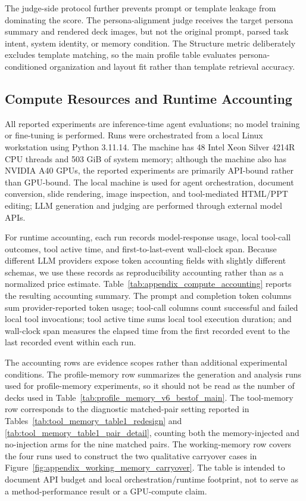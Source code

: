 The judge-side protocol further prevents prompt or template leakage from
dominating the score. The persona-alignment judge receives the target persona
summary and rendered deck images, but not the original prompt, parsed task
intent, system identity, or memory condition. The Structure metric deliberately
excludes template matching, so the main profile table evaluates
persona-conditioned organization and layout fit rather than template retrieval
accuracy.

\subsection{Compute Resources and Runtime Accounting}
\label{app:compute_resources}

All reported experiments are inference-time agent evaluations; no model
training or fine-tuning is performed. Runs were orchestrated from a local
Linux workstation using Python 3.11.14. The machine has 48 Intel Xeon Silver
4214R CPU threads and 503 GiB of system memory; although the machine also has
NVIDIA A40 GPUs, the reported experiments are primarily API-bound rather than
GPU-bound. The local machine is used for agent orchestration, document
conversion, slide rendering, image inspection, and tool-mediated HTML/PPT
editing; LLM generation and judging are performed through external model APIs.

For runtime accounting, each run records model-response usage, local tool-call
outcomes, tool active time, and first-to-last-event wall-clock span. Because
different LLM providers expose token accounting fields with slightly different
schemas, we use these records as reproducibility accounting rather than as a
normalized price estimate. Table~\ref{tab:appendix_compute_accounting} reports
the resulting accounting summary. The prompt and completion token columns sum
provider-reported token usage; tool-call columns count successful and failed
local tool invocations; tool active time sums local tool execution duration; and
wall-clock span measures the elapsed time from the first recorded event to the
last recorded event within each run.

The accounting rows are evidence scopes rather than additional experimental
conditions. The profile-memory row summarizes the generation and analysis runs
used for profile-memory experiments, so it should not be read as the number of
decks used in Table~\ref{tab:profile_memory_v6_bestof_main}.
The tool-memory row corresponds to the diagnostic matched-pair setting reported
in Tables~\ref{tab:tool_memory_table1_redesign} and
\ref{tab:tool_memory_table1_pair_detail}, counting both the memory-injected and
no-injection arms for the nine matched pairs. The working-memory row covers the
four runs used to construct the two qualitative carryover cases in
Figure~\ref{fig:appendix_working_memory_carryover}. The table is intended to
document API budget and local orchestration/runtime footprint, not to serve as a
method-performance result or a GPU-compute claim.

